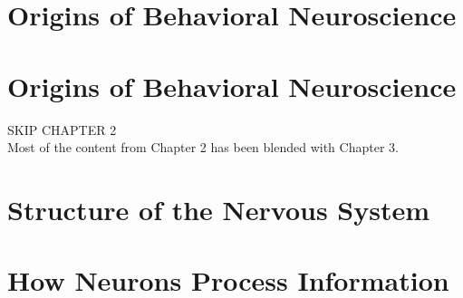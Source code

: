 \documentclass[12pt, oneside]{book}
\begin{document}

\setcounter{chapter}{0}
\chapter{Origins of Behavioral Neuroscience}
\vspace*{-0.25in}

\setcounter{chapter}{0}
\chapter{Origins of Behavioral Neuroscience}
\vspace*{-0.25in}


% 
\newpage
{}
\fancyhead[R]{}

\begin{center}
    \textsc{SKIP CHAPTER 2} \\
    Most of the content from Chapter 2 has been blended with Chapter 3. \\
\end{center}
\newpage

\setcounter{chapter}{2}
\chapter{Structure of the Nervous System}
\vspace*{-0.25in}


\setcounter{chapter}{5}
\chapter{How Neurons Process Information}
\vspace*{-0.25in}


% 
\end{document}
